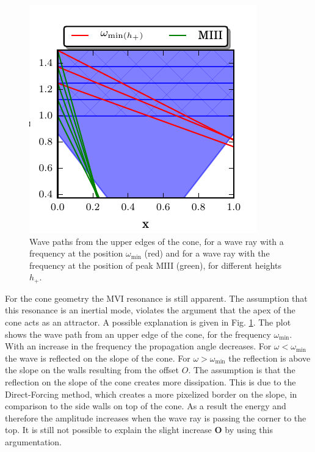 \begin{figure}[!t]
  \begin{minipage}[c]{0.4\textwidth}
      \centering
      \includegraphics{gfx/cone/discussion/corners.pdf}
  \end{minipage}
  \hfill
  \begin{minipage}[c]{0.5\textwidth}
      \caption{\label{fig:conediscuss:corners}
        Wave paths from the upper edges of the cone,
        for a wave ray with a frequency at the position $\omega_{\text{min}}$ (red) and
        for a wave ray with the frequency at the position of peak M\RN{3} (green),
            for different heights $h_+$.
      }
  \end{minipage}
\end{figure}



For the cone geometry the M\RN{6} resonance is still apparent.
The assumption that this resonance is an inertial mode,
violates the argument that the apex of the cone acts as
an attractor.
A possible explanation is given in Fig. \ref{fig:conediscuss:corners}.
The plot shows the wave path from an upper edge of the cone, for the frequency $\omega_{\text{min}}$.
With an increase in the frequency the propagation angle decreases.
For $\omega<\omega_{\text{min}}$ the wave is reflected on the slope of the cone.
For $\omega>\omega_{\text{min}}$ the reflection is above the slope on the walls resulting from the offset $O$.
The assumption is that the reflection on the slope of the cone creates more dissipation.
This is due to the Direct-Forcing method, which creates a more pixelized border on the slope,
in comparison to the side walls on top of the cone.
As a result the energy and therefore the amplitude increases
when the wave ray is passing the corner to the top.
It is still not possible to explain the slight increase \textbf{O} by using this argumentation.

